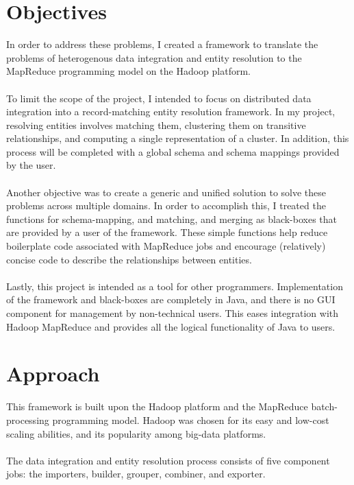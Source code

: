 \documentclass[12pt]{article}
\begin{document}
\section{Objectives}
In order to address these problems, I created a framework to translate the problems of heterogenous data integration and entity resolution to the MapReduce programming model on the Hadoop platform. \\\\
To limit the scope of the project, I intended to focus on distributed data integration into a record-matching entity resolution framework. 
In my project, resolving entities involves matching them, clustering them on transitive relationships, and computing a single representation of a cluster. 
In addition, this process will be completed with a global schema and schema mappings provided by the user.\\\\
Another objective was to create a generic and unified solution to solve these problems across multiple domains.
In order to accomplish this, I treated the functions for schema-mapping, and matching, and merging as black-boxes that are provided by a user of the framework. These simple functions help reduce boilerplate code associated with MapReduce jobs and encourage (relatively) concise code to describe the relationships between entities.\\\\
Lastly, this project is intended as a tool for other programmers. 
Implementation of the framework and black-boxes are completely in Java, and there is no GUI component for management by non-technical users. 
This eases integration with Hadoop MapReduce and provides all the logical functionality of Java to users. 

\section{Approach}
This framework is built upon the Hadoop platform and the MapReduce batch-processing programming model. 
Hadoop was chosen for its easy and low-cost scaling abilities, and its popularity among big-data platforms.\\\\
The data integration and entity resolution process consists of five component jobs: the importers, builder, grouper, combiner, and exporter.
\end{document}
